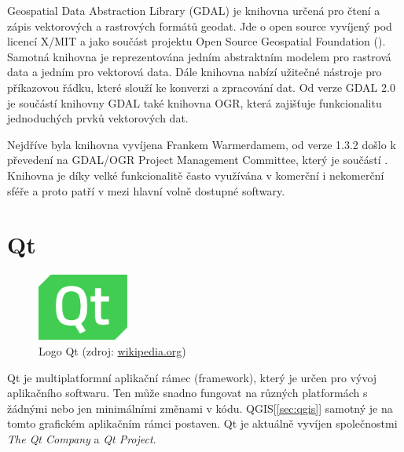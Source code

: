 Geospatial Data Abstraction Library (GDAL) je knihovna určená pro čtení
a zápis vektorových a rastrových formátů geodat. Jde o open source
vyvíjený pod licencí X/MIT a jako součást projektu Open Source
Geospatial Foundation (). Samotná knihovna je reprezentována
jedním abstraktním modelem pro rastrová data a jedním pro vektorová
data. Dále knihovna nabízí užitečné nástroje pro příkazovou řádku,
které slouží ke konverzi a zpracování dat. Od verze GDAL 2.0 je
součástí knihovny GDAL také knihovna OGR, která zajišťuje
funkcionalitu jednoduchých prvků vektorových dat.

Nejdříve byla knihovna vyvíjena Frankem Warmerdamem, od verze 1.3.2
došlo k převedení na GDAL/OGR Project Management Committee, který je
součástí . Knihovna je díky velké funkcionalitě často
využívána v komerční i nekomerční sféře a proto patří v  mezi
hlavní volně dostupné softwary. \cite{gdal, gdal_wiki}

\section{Qt}

\begin{figure}[H]
	 \centering
      \includegraphics[width=3cm]{./pictures/qt-logo.png}
      \caption{Logo Qt (zdroj:
\href{https://upload.wikimedia.org/wikipedia/commons/thumb/0/0b/Qt_logo_2016.svg/578px-Qt_logo_2016.svg.png}{wikipedia.org})}
      \label{fig:qt}
  \end{figure}

Qt je multiplatformní aplikační rámec (framework), který je určen pro vývoj aplikačního softwaru. Ten může
snadno fungovat na různých platformách s žádnými nebo jen minimálními
změnami v kódu. QGIS[\ref{sec:qgis}] samotný je na tomto grafickém aplikačním rámci postaven. Qt je aktuálně vyvíjen společnostmi \textit{The Qt
  Company} a \textit{Qt Project}.\cite{qt_wiki, qt}


